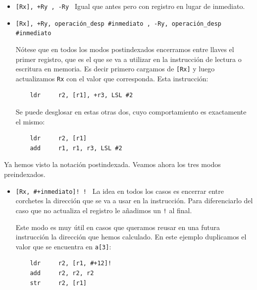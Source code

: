 \begin{descript}
\begin{itemize}
  \item{\tt [Rx], +Ry \newline
            [Rx], -Ry \newline}
    Igual que antes pero con registro en lugar de inmediato.

  \item{\tt [Rx], +Ry, operación\_desp \#inmediato \newline
            [Rx], -Ry, operación\_desp \#inmediato \newline}

    Nótese que en todos los modos postindexados
    encerramos entre llaves el primer registro, que es el que se va
    a utilizar en la instrucción de lectura o escritura en memoria. Es decir
    primero cargamos de {\tt [Rx]} y luego actualizamos {\tt Rx} con el valor
    que corresponda. Esta instrucción:

\begin{lstlisting}
    ldr     r2, [r1], +r3, LSL #2
\end{lstlisting}

    Se puede desglosar en estas otras dos, cuyo comportamiento es exactamente
    el mismo:

\begin{lstlisting}
    ldr     r2, [r1]
    add     r1, r1, r3, LSL #2
\end{lstlisting}
\end{itemize}

    Ya hemos visto la notación postindexada. Veamos ahora los tres modos
    preindexados.

\begin{itemize}
  \item{\tt [Rx, \#+inmediato]! \newline
            [Rx, \#-inmediato]! \newline}
    La idea en todos los casos es encerrar entre corchetes la dirección que
    se va a usar en la instrucción. Para diferenciarlo del caso que no actualiza
    el registro le añadimos un {\tt !} al final.

    Este modo es muy útil en casos que queramos reusar en una futura instrucción
    la dirección que hemos calculado. En este ejemplo duplicamos el valor
    que se encuentra en {\tt a[3]}:

\begin{lstlisting}
    ldr     r2, [r1, #+12]!
    add     r2, r2, r2
    str     r2, [r1]
\end{lstlisting}


\end{itemize}
\end{descript}
